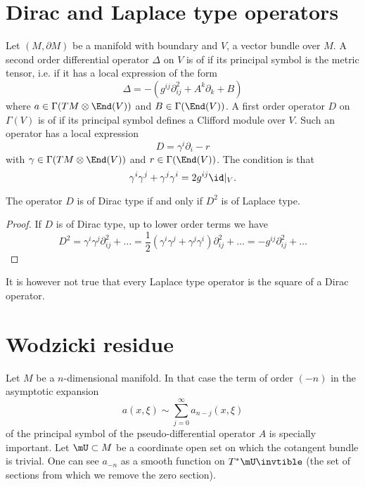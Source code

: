 \section{Dirac and Laplace type operators}

Let $(M,\partial M)$ be a manifold with boundary and $V$, a vector bundle over $M$. A second order differential operator $\Delta$ on $V$ is of  if its principal symbol is the metric tensor, i.e. if it has a local expression of the form
\begin{equation}
\Delta = -(g^{ij}\partial^2_{ij}+A^k\partial_k+B)
\end{equation}
where $a\in \Gamma(TM\otimes\End(V))$ and $B\in\Gamma(\End(V))$. A first order operator $D$ on $\Gamma(V)$ is of  if its principal symbol defines a Clifford module over $V$. Such an operator has a local expression
\begin{equation}			\label{EqFormGeneDirac}
	D=\gamma^i\partial_i-r
\end{equation}
with $\gamma\in\Gamma(TM\otimes\End(V))$ and $r\in\Gamma(\End(V))$. The condition is that
\begin{equation}
\gamma^i\gamma^j+\gamma^j\gamma^i=2g^{ij}\id|_V.
\end{equation}

\begin{proposition}
The operator $D$ is of Dirac type if and only if $D^2$ is of Laplace type.
\end{proposition}

\begin{proof}
If $D$ is of Dirac type, up to lower order terms we have
\[ 
  D^2=\gamma^i\gamma^j\partial^2_{ij}+\ldots=\frac{ 1 }{2}(\gamma^i\gamma^j+\gamma^j\gamma^i)\partial^2_{ij}+\ldots=-g^{ij}\partial^2_{ij}+\ldots
\]
\end{proof}
It is however not true that every Laplace type operator is the square of a Dirac operator.

\section{Wodzicki residue}

Let $M$ be a $n$-dimensional manifold. In that case the term of order $(-n)$ in the asymptotic expansion 
\[ 
  a(x,\xi)\sim\sum_{j=0}^{\infty}a_{n-j}(x,\xi)
\]
of the principal symbol of the pseudo-differential operator $A$ is specially important. Let $\mU\subset M$ be a coordinate open set on which the cotangent bundle is trivial. One can see $a_{-n}$ as a smooth function on $T^*\mU\invtible$ (the set of sections from which we remove the zero section).

